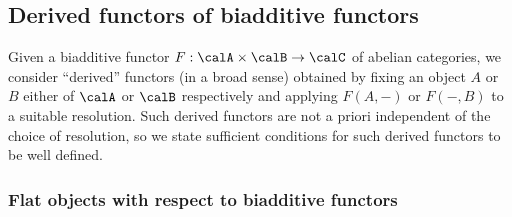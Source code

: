 

















\subsection{Derived functors of biadditive functors}


Given a biadditive functor $F: \calA \times \calB \to \calC$ of abelian categories, we consider ``derived'' functors (in a broad sense) obtained by fixing an object $A$ or $B$ either of $\calA$ or $\calB$ respectively and applying $F(A,-)$ or $F(-,B)$ to a suitable resolution. Such derived functors are not a priori independent of the choice of resolution, so we state sufficient conditions for such derived functors to be well defined.

\subsubsection{Flat objects with respect to biadditive functors}




% 


